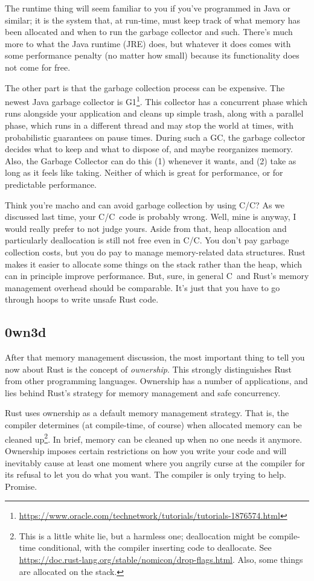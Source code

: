 \documentclass[a4paper]{report}
\newcommand{\CPP}{C\nolinebreak\hspace{-.05em}\raisebox{.4ex}{\tiny\bf +}\nolinebreak\hspace{-.10em}\raisebox{.4ex}{\tiny\bf +}}
\def\CPP{{C\nolinebreak[4]\hspace{-.05em}\raisebox{.4ex}{\tiny\bf ++}}}
\begin{document}
The runtime thing will seem familiar to you if you've programmed in Java or similar; it is the system that, at run-time, must keep track of what memory has been allocated and when to run the garbage collector and such. There's much more to what the Java runtime (JRE) does, but whatever it does comes with some performance penalty (no matter how small) because its functionality does not come for free. 

The other part is that the garbage collection process can be expensive. The newest Java garbage collector is G1\footnote{\url{https://www.oracle.com/technetwork/tutorials/tutorials-1876574.html}}. This collector has a concurrent phase which runs alongside your application and cleans up simple trash, along with a parallel phase, which runs in a different thread and may stop the world at times, with probabilistic guarantees on pause times. During such a GC, the garbage collector decides what to keep and what to dispose of, and maybe reorganizes memory.  Also, the Garbage Collector can do this (1) whenever it wants, and (2) take as long as it feels like taking. Neither of which is great for performance, or for predictable performance.

Think you're macho and can avoid garbage collection by using C/\CPP? As we discussed last time, your C/\CPP~code is probably wrong. Well, mine is anyway, I would really prefer to not judge yours. Aside from that, heap allocation and particularly deallocation is still not free even in C/\CPP. You don't pay garbage collection costs, but you do pay to manage memory-related data structures. Rust makes it easier to allocate some things on the stack rather than the heap, which can in principle improve performance. But, sure, in general \CPP~and Rust's memory management overhead should be comparable. It's just that you have to go through hoops to write unsafe Rust code.

\subsection*{0wn3d} After that memory management discussion, the most important thing to tell you now about Rust is the concept of \textit{ownership}. This strongly distinguishes Rust from other programming languages. Ownership has a number of applications, and lies behind Rust's strategy for memory management and safe concurrency.

Rust uses ownership as a default memory management strategy. That is, the compiler determines (at compile-time, of course) when allocated memory can be cleaned up\footnote{This is a little white lie, but a harmless one; deallocation might be compile-time conditional, with the compiler inserting code to deallocate. See \url{https://doc.rust-lang.org/stable/nomicon/drop-flags.html}. Also, some things are allocated on the stack.}. In brief, memory can be cleaned up when no one needs it anymore. Ownership imposes certain restrictions on how you write your code and will inevitably cause at least one moment where you angrily curse at the compiler for its refusal to let you do what you want. The compiler is only trying to help. Promise.
\end{document}
